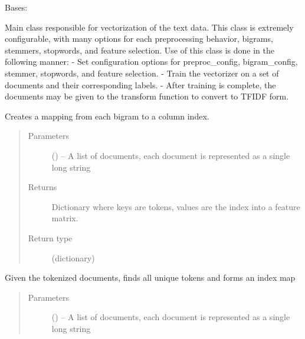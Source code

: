 \documentclass[letterpaper,10pt,english]{sphinxmanual}
\begin{document}
\begin{fulllineitems}
\label{\detokenize{KUHERD:KUHERD.HerdVectorizer.HerdVectorizer}}
Bases: 

Main class responsible for vectorization of the text data. This class is extremely configurable, with many
options for each preprocessing behavior, bigrams, stemmers, stopwords, and feature selection. Use of this
class is done in the following manner:
- Set configuration options for preproc\_config, bigram\_config, stemmer, stopwords, and feature selection.
- Train the vectorizer on a set of documents and their corresponding labels.
- After training is complete, the documents may be given to the transform function to convert to TFIDF form.

\begin{fulllineitems}
\label{\detokenize{KUHERD:KUHERD.HerdVectorizer.HerdVectorizer.create_bigram_index_map}}
Creates a mapping from each bigram to a column index.
\begin{quote}\begin{description}
\item[{Parameters}] \leavevmode
{} () -- A list of documents, each document is represented as a single long string

\item[{Returns}] \leavevmode
Dictionary where keys are tokens, values are the index into a feature matrix.

\item[{Return type}] \leavevmode
(dictionary)

\end{description}\end{quote}

\end{fulllineitems}


\begin{fulllineitems}
\label{\detokenize{KUHERD:KUHERD.HerdVectorizer.HerdVectorizer.create_token_index_map}}
Given the tokenized documents, finds all unique tokens and forms an index map
\begin{quote}\begin{description}
\item[{Parameters}] \leavevmode
{} () -- A list of documents, each document is represented as a single long string


\end{description}
\end{quote}
\end{fulllineitems}
\end{fulllineitems}
\end{document}
